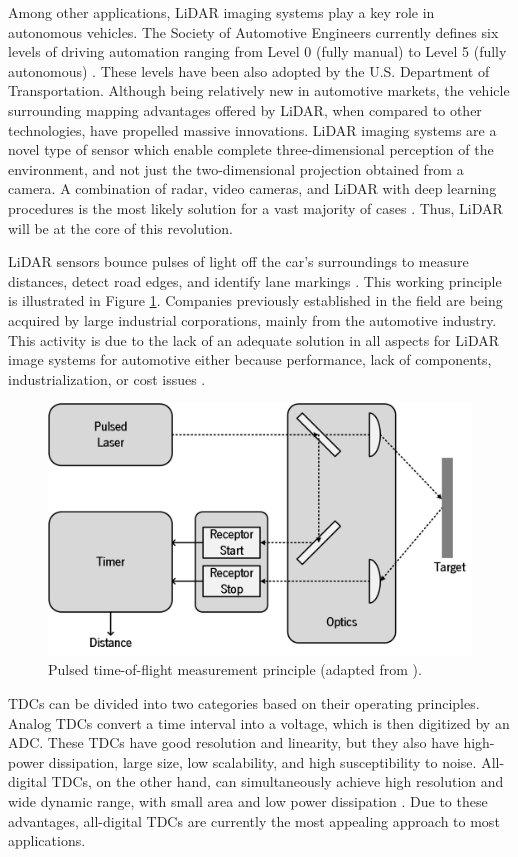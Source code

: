 Among other applications, \gls{LiDAR} imaging systems play a key role in autonomous vehicles. The Society of Automotive Engineers currently defines six levels of driving automation ranging from Level 0 (fully manual) to Level 5 (fully autonomous) \citep{sae_av}. These levels have been also adopted by the U.S. Department of Transportation. Although being relatively new in automotive markets, the vehicle surrounding mapping advantages offered by \gls{LiDAR}, when compared to other technologies, have propelled massive innovations. \gls{LiDAR} imaging systems are a novel type of sensor which enable complete three-dimensional perception of the environment, and not just the two-dimensional projection obtained from a camera. A combination of radar, video cameras, and \gls{LiDAR} with deep learning procedures is the most likely solution for a vast majority of cases \citep{lidar_ov}. Thus, \gls{LiDAR} will be at the core of this revolution.

\Gls{LiDAR} sensors bounce pulses of light off the car’s surroundings to measure distances, detect road edges, and identify lane markings \citep{lidar_ov}. This working principle is illustrated in Figure \ref{fig:lidar}. Companies previously established in the field are being acquired by large industrial corporations, mainly from the automotive industry. This activity is due to the lack of an adequate solution in all aspects for \gls{LiDAR} image systems for automotive either because performance, lack of components, industrialization, or cost issues \citep{lidar_ov}.

\begin{figure}[ht!]
    \centering
    \includegraphics[width=.5\textwidth]{img/01_introduction/LiDAR.png}
    \caption{Pulsed time-of-flight measurement principle (adapted from \citep{lidar_ov}).}
    \label{fig:lidar}
\end{figure}

\Glspl{TDC} can be divided into two categories based on their operating principles. Analog \glspl{TDC} convert a time interval into a voltage, which is then digitized by an \gls{ADC}. These \glspl{TDC} have good resolution and linearity, but they also have high-power dissipation, large size, low scalability, and high susceptibility to noise. All-digital \glspl{TDC}, on the other hand, can simultaneously achieve high resolution and wide dynamic range, with small area and low power dissipation \citep{cheng_ov}. Due to these advantages, all-digital \glspl{TDC} are currently the most appealing approach to most applications.


